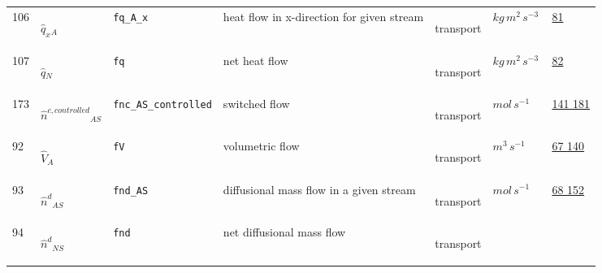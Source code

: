 \begin{longtable}{|p{1cm}|p{2.5cm}|p{4.5cm}|p{8cm}|p{3.0cm}|p{3cm}|p{1cm}|}
                 \\
            106
             & \hypertarget{"v:106"}{ $ {{\hat{q}_{x}}}{_{A}} $}
             & \verb|fq_A_x|
             & heat flow in x-direction for given stream
             & \begin{lay}transport \end{lay}
             & $ kg \,m^{2} \,s^{-3} \, $
             &                 \hyperlink{"e:81"}{ 81 }
                 \\
            107
             & \hypertarget{"v:107"}{ $ {{\hat{q}}}{_{N}} $}
             & \verb|fq|
             & net heat flow
             & \begin{lay}transport \end{lay}
             & $ kg \,m^{2} \,s^{-3} \, $
             &                 \hyperlink{"e:82"}{ 82 }
                 \\
            173
             & \hypertarget{"v:173"}{ $ {\hat{n}^{c,controlled}}{_{{A S}}} $}
             & \verb|fnc_AS_controlled|
             & switched flow
             & \begin{lay}transport \end{lay}
             & $ mol \,s^{-1} \, $
             &                 \hyperlink{"e:141"}{ 141 }
                                 \hyperlink{"e:181"}{ 181 }
                 \\
            92
             & \hypertarget{"v:92"}{ $ {\hat{V}}{_{A}} $}
             & \verb|fV|
             & volumetric flow
             & \begin{lay}transport \end{lay}
             & $ m^{3} \,s^{-1} \, $
             &                 \hyperlink{"e:67"}{ 67 }
                                 \hyperlink{"e:140"}{ 140 }
                 \\
            93
             & \hypertarget{"v:93"}{ $ {{\hat{n}^{d}}}{_{{A S}}} $}
             & \verb|fnd_AS|
             & diffusional mass flow in a given stream
             & \begin{lay}transport \end{lay}
             & $ mol \,s^{-1} \, $
             &                 \hyperlink{"e:68"}{ 68 }
                                 \hyperlink{"e:152"}{ 152 }
                 \\
            94
             & \hypertarget{"v:94"}{ $ {{\hat{n}^{d}}}{_{{N S}}} $}
             & \verb|fnd|
             & net diffusional mass flow
             & \begin{lay}transport \end{lay}

\end{longtable}
